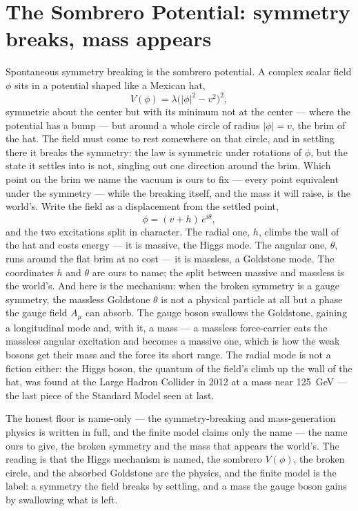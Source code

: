 \section{The Sombrero Potential: symmetry breaks, mass appears}
\label{se:sombrero}

Spontaneous symmetry breaking is the sombrero potential. A complex scalar field $\phi$ sits in a potential
shaped like a Mexican hat,
\begin{equation}
  V(\phi) = \lambda\bigl(|\phi|^2 - v^2\bigr)^2,
\end{equation}
symmetric about the center but with its minimum not at the center --- where the potential has a bump --- but
around a whole circle of radius $|\phi| = v$, the brim of the hat. The field must come to rest somewhere on
that circle, and in settling there it breaks the symmetry: the law is symmetric under rotations of $\phi$,
but the state it settles into is not, singling out one direction around the brim. Which point on the brim we
name the vacuum is ours to fix --- every point equivalent under the symmetry --- while the breaking itself, and
the mass it will raise, is the world's. Write the field as a displacement from the settled point,
\begin{equation}
  \phi = (v + h)\,e^{i\theta},
\end{equation}
and the two excitations split in character. The radial one, $h$, climbs the wall of the hat and costs energy
--- it is massive, the Higgs mode. The angular one, $\theta$, runs around the flat brim at no cost --- it is
massless, a Goldstone mode. The coordinates $h$ and $\theta$ are ours to name; the split between massive and
massless is the world's. And here is the mechanism: when the broken symmetry is a gauge symmetry, the
massless Goldstone $\theta$ is not a physical particle at all but a phase the gauge field $A_\mu$ can absorb.
The gauge boson swallows the Goldstone, gaining a longitudinal mode and, with it, a mass --- a massless
force-carrier eats the massless angular excitation and becomes a massive one, which is how the weak bosons get
their mass and the force its short range. The radial mode is not a fiction either: the Higgs boson, the
quantum of the field's climb up the wall of the hat, was found at the Large Hadron Collider in 2012 at a mass
near 125~GeV --- the last piece of the Standard Model seen at last.

The honest floor is name-only --- the symmetry-breaking and mass-generation physics is written in full, and the
finite model claims only the name --- the name ours to give, the broken symmetry and the mass that appears the
world's. The reading is that the Higgs mechanism is named, the sombrero $V(\phi)$, the broken circle, and the
absorbed Goldstone are the physics, and the finite model is the label: a symmetry the field breaks by settling,
and a mass the gauge boson gains by swallowing what is left.

